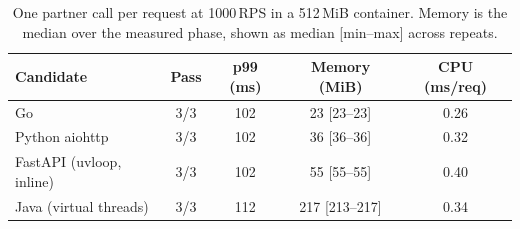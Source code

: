 \begin{table}[t]
\caption{One partner call per request at 1000\,RPS in a 512\,MiB container. Memory is the median over the measured phase, shown as median [min--max] across repeats.}
\label{tab:memory}
\centering\small
\begin{tabular}{lcccc}
\toprule
Candidate & Pass & p99 (ms) & Memory (MiB) & CPU (ms/req) \\
\midrule
Go & 3/3 & 102 & 23 [23--23] & 0.26 \\
Python aiohttp & 3/3 & 102 & 36 [36--36] & 0.32 \\
FastAPI (uvloop, inline) & 3/3 & 102 & 55 [55--55] & 0.40 \\
Java (virtual threads) & 3/3 & 112 & 217 [213--217] & 0.34 \\
\bottomrule
\end{tabular}
\end{table}
